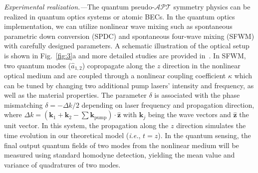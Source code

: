 \documentclass[twocolumn,prl,floatfix,citeautoscript,nofootinbib,superscriptaddress]{revtex4}
\begin{document}
\emph{{\color{blue}Experimental realization.---}}The quantum pseudo-$%
\mathcal{APT}$ symmetry physics can be realized in quantum optics systems or
atomic BECs. In the quantum optics implementation, we can utilize nonlinear
wave mixing such as spontaneous parametric down conversion (SPDC) \cite%
{SPDC01, SPDC02} and spontaneous four-wave mixing (SFWM) \cite{SFWM01,
SFWM02} with carefully designed parameters. A schematic illustration of the
optical setup is shown in Fig.~\ref{fig:3}a and more detailed studies are
provided in~\cite{SM}. In SFWM, two quantum modes ($\hat{a}_{1,2}$)
copropagate along the $z$ direction in the nonlinear optical medium and are
coupled through a nonlinear coupling coefficient $\kappa $ which can be
tuned by changing two additional pump lasers' intensity and frequency, as
well as the material properties. The parameter $\delta $ is associated with
the phase mismatching $\delta =-\Delta k/2$ depending on laser frequency and
propagation direction, where $\Delta k=(\mathbf{k}_{1}+\mathbf{k}_{2}-\sum
\mathbf{k}_{\text{pump}})\cdot \hat{\mathbf{z}}$ with $\mathbf{k}_{j}$ being
the wave vectors and $\hat{\mathbf{z}}$ the unit vector. In this system, the
propagation along the $z$ direction simulates the time evolution in our
theoretical model (\textit{i.e.}, $t=z$). In the quantum sensing, the final
output quantum fields of two modes from the nonlinear medium will be
measured using standard homodyne detection, yielding the mean value and
variance of quadratures of two modes.
\end{document}
